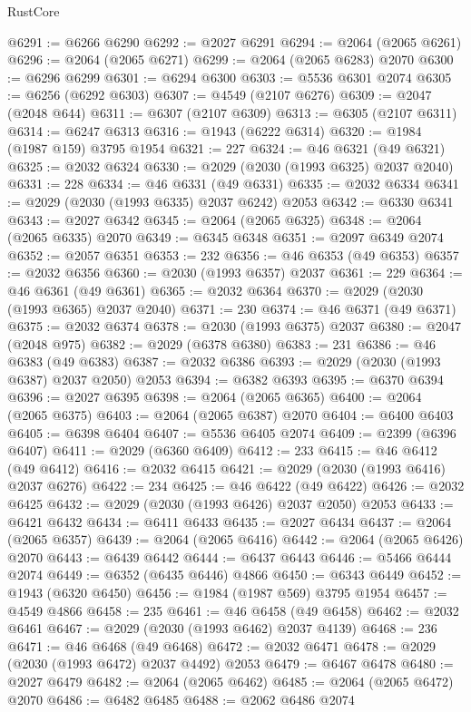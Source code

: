 \begin{lexlean}{RustCore}
\begin{coremodule}
@6291 := @6266 @6290
@6292 := @2027 @6291
@6294 := @2064 (@2065 @6261)
@6296 := @2064 (@2065 @6271)
@6299 := @2064 (@2065 @6283) @2070
@6300 := @6296 @6299
@6301 := @6294 @6300
@6303 := @5536 @6301 @2074
@6305 := @6256 (@6292 @6303)
@6307 := @4549 (@2107 @6276)
@6309 := @2047 (@2048 @644)
@6311 := @6307 (@2107 @6309)
@6313 := @6305 (@2107 @6311)
@6314 := @6247 @6313
@6316 := @1943 (@6222 @6314)
@6320 := @1984 (@1987 @159) @3795 @1954
@6321 := 227
@6324 := @46 @6321 (@49 @6321)
@6325 := @2032 @6324
@6330 := @2029 (@2030 (@1993 @6325) @2037 @2040)
@6331 := 228
@6334 := @46 @6331 (@49 @6331)
@6335 := @2032 @6334
@6341 := @2029 (@2030 (@1993 @6335) @2037 @6242) @2053
@6342 := @6330 @6341
@6343 := @2027 @6342
@6345 := @2064 (@2065 @6325)
@6348 := @2064 (@2065 @6335) @2070
@6349 := @6345 @6348
@6351 := @2097 @6349 @2074
@6352 := @2057 @6351
@6353 := 232
@6356 := @46 @6353 (@49 @6353)
@6357 := @2032 @6356
@6360 := @2030 (@1993 @6357) @2037
@6361 := 229
@6364 := @46 @6361 (@49 @6361)
@6365 := @2032 @6364
@6370 := @2029 (@2030 (@1993 @6365) @2037 @2040)
@6371 := 230
@6374 := @46 @6371 (@49 @6371)
@6375 := @2032 @6374
@6378 := @2030 (@1993 @6375) @2037
@6380 := @2047 (@2048 @975)
@6382 := @2029 (@6378 @6380)
@6383 := 231
@6386 := @46 @6383 (@49 @6383)
@6387 := @2032 @6386
@6393 := @2029 (@2030 (@1993 @6387) @2037 @2050) @2053
@6394 := @6382 @6393
@6395 := @6370 @6394
@6396 := @2027 @6395
@6398 := @2064 (@2065 @6365)
@6400 := @2064 (@2065 @6375)
@6403 := @2064 (@2065 @6387) @2070
@6404 := @6400 @6403
@6405 := @6398 @6404
@6407 := @5536 @6405 @2074
@6409 := @2399 (@6396 @6407)
@6411 := @2029 (@6360 @6409)
@6412 := 233
@6415 := @46 @6412 (@49 @6412)
@6416 := @2032 @6415
@6421 := @2029 (@2030 (@1993 @6416) @2037 @6276)
@6422 := 234
@6425 := @46 @6422 (@49 @6422)
@6426 := @2032 @6425
@6432 := @2029 (@2030 (@1993 @6426) @2037 @2050) @2053
@6433 := @6421 @6432
@6434 := @6411 @6433
@6435 := @2027 @6434
@6437 := @2064 (@2065 @6357)
@6439 := @2064 (@2065 @6416)
@6442 := @2064 (@2065 @6426) @2070
@6443 := @6439 @6442
@6444 := @6437 @6443
@6446 := @5466 @6444 @2074
@6449 := @6352 (@6435 @6446) @4866
@6450 := @6343 @6449
@6452 := @1943 (@6320 @6450)
@6456 := @1984 (@1987 @569) @3795 @1954
@6457 := @4549 @4866
@6458 := 235
@6461 := @46 @6458 (@49 @6458)
@6462 := @2032 @6461
@6467 := @2029 (@2030 (@1993 @6462) @2037 @4139)
@6468 := 236
@6471 := @46 @6468 (@49 @6468)
@6472 := @2032 @6471
@6478 := @2029 (@2030 (@1993 @6472) @2037 @4492) @2053
@6479 := @6467 @6478
@6480 := @2027 @6479
@6482 := @2064 (@2065 @6462)
@6485 := @2064 (@2065 @6472) @2070
@6486 := @6482 @6485
@6488 := @2062 @6486 @2074

\end{coremodule}
\end{lexlean}
